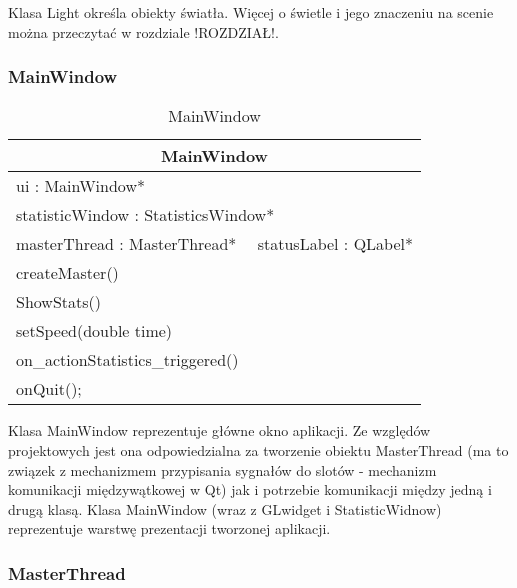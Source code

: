 Klasa Light określa obiekty światła. Więcej o świetle i jego znaczeniu na scenie można przeczytać w rozdziale !ROZDZIAŁ!.

\subsubsection{MainWindow}

\footnotesize
\begin{longtable}{|p{14cm}|}
    \caption{MainWindow} \label{tab:MainWindow} \\ \hline
    \multicolumn{1}{|c|}{MainWindow} \\ \hline
    ui : MainWindow* \\
    statisticWindow : StatisticsWindow* \\
    masterThread : MasterThread* \ \
    statusLabel : QLabel* \\ \hline
    createMaster() \\
    ShowStats() \\
    setSpeed(double time) \\
    on\_actionStatistics\_triggered() \\
    onQuit(); \\ \hline
\end{longtable}
\normalsize

Klasa MainWindow reprezentuje główne okno aplikacji. Ze względów projektowych jest ona odpowiedzialna za tworzenie obiektu MasterThread (ma to związek z mechanizmem przypisania sygnałów do slotów - mechanizm komunikacji międzywątkowej w Qt) jak i potrzebie komunikacji między jedną i drugą klasą. Klasa MainWindow (wraz z GLwidget i StatisticWidnow) reprezentuje warstwę prezentacji tworzonej aplikacji.

\subsubsection{MasterThread}

